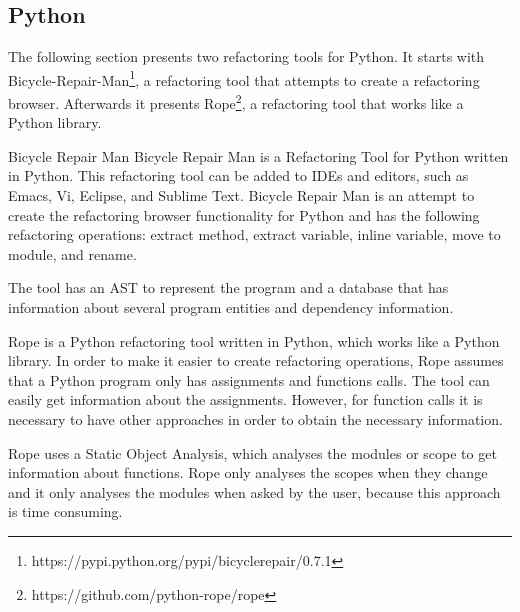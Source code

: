 
\subsection{Python}

The following section presents two refactoring tools for Python.
It starts with Bicycle-Repair-Man\footnote{https://pypi.python.org/pypi/bicyclerepair/0.7.1},
 a refactoring tool that attempts to create a refactoring browser.
Afterwards it presents Rope\footnote{https://github.com/python-rope/rope}, a
refactoring tool that works like a Python library.


Bicycle Repair Man
Bicycle Repair Man is a Refactoring Tool for Python written in Python.
 This refactoring tool can be added to IDEs and editors, such as Emacs, Vi, Eclipse,
  and Sublime Text.
Bicycle Repair Man is an attempt to create the refactoring browser functionality for
 Python and has the following refactoring operations:
 extract method, extract variable, inline variable, move to module, and rename.

The tool has an AST to represent the program and a database that has information
about several program entities and dependency information.



Rope is a Python refactoring tool written in Python, which works like a Python library.
In order to make it easier to create refactoring operations, Rope assumes that a
Python program only has assignments and functions calls. %
The tool can easily get information about the assignments.
However, for function calls it is necessary to have other approaches in order to
obtain the necessary information.

Rope uses a Static Object Analysis, which analyses the modules or scope to get
information about functions.
Rope only analyses the scopes when they change and it only analyses the modules
when asked by the user, because this approach is time consuming.


